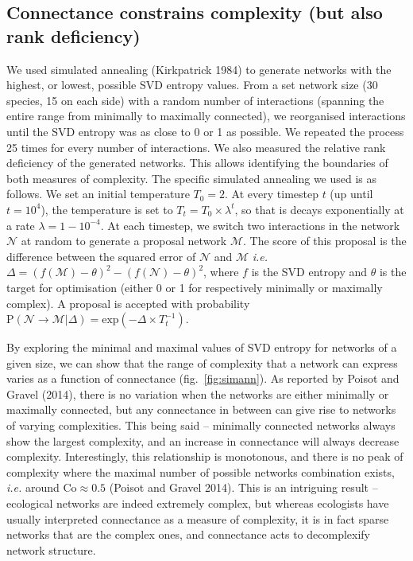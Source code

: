 \documentclass[10pt,oneside]{article}
\begin{document}
\hypertarget{connectance-constrains-complexity-but-also-rank-deficiency}{%
\subsection{Connectance constrains complexity (but also rank
deficiency)}\label{connectance-constrains-complexity-but-also-rank-deficiency}}

We used simulated annealing (Kirkpatrick 1984) to generate networks with
the highest, or lowest, possible SVD entropy values. From a set network
size (30 species, 15 on each side) with a random number of interactions
(spanning the entire range from minimally to maximally connected), we
reorganised interactions until the SVD entropy was as close to 0 or 1 as
possible. We repeated the process 25 times for every number of
interactions. We also measured the relative rank deficiency of the
generated networks. This allows identifying the boundaries of both
measures of complexity. The specific simulated annealing we used is as
follows. We set an initial temperature \(T_0 = 2\). At every timestep
\(t\) (up until \(t = 10^4\)), the temperature is set to
\(T_t = T_0\times\lambda^t\), so that is decays exponentially at a rate
\(\lambda = 1 - 10^{-4}\). At each timestep, we switch two interactions
in the network \(\mathcal{N}\) at random to generate a proposal network
\(\mathcal{M}\). The score of this proposal is the difference between
the squared error of \(\mathcal{N}\) and \(\mathcal{M}\) \emph{i.e.}
\(\Delta = (f(\mathcal{M})-\theta)^2-(f(\mathcal{N})-\theta)^2\), where
\(f\) is the SVD entropy and \(\theta\) is the target for optimisation
(either 0 or 1 for respectively minimally or maximally complex). A
proposal is accepted with probability
\(\text{P}(\mathcal{N} \rightarrow \mathcal{M} | \Delta) = \text{exp}\left(-\Delta\times T_t^{-1}\right)\).

By exploring the minimal and maximal values of SVD entropy for networks
of a given size, we can show that the range of complexity that a network
can express varies as a function of connectance (fig.~\ref{fig:simann}).
As reported by Poisot and Gravel (2014), there is no variation when the
networks are either minimally or maximally connected, but any
connectance in between can give rise to networks of varying
complexities. This being said -- minimally connected networks always
show the largest complexity, and an increase in connectance will always
decrease complexity. Interestingly, this relationship is monotonous, and
there is no peak of complexity where the maximal number of possible
networks combination exists, \emph{i.e.} around
\(\text{Co} \approx 0.5\) (Poisot and Gravel 2014). This is an
intriguing result -- ecological networks are indeed extremely complex,
but whereas ecologists have usually interpreted connectance as a measure
of complexity, it is in fact sparse networks that are the complex ones,
and connectance acts to decomplexify network structure.
\end{document}
